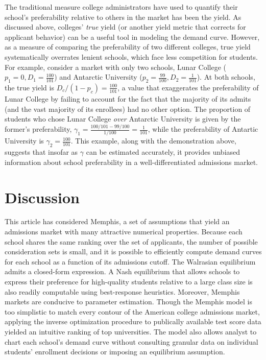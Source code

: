 \documentclass[12pt]{article}
\numberwithin{equation}{subsection}
\theoremstyle{definition}
\begin{document}
The traditional measure college administrators have used to quantify their school's preferability relative to others in the market has been the yield. As discussed above, colleges' \emph{true} yield (or another yield metric that corrects for applicant behavior) can be a useful tool in modeling the demand curve. However, as a measure of comparing the preferability of two different colleges, true yield systematically overrates lenient schools, which face less competition for students. For example, consider a market with only two schools, Lunar College ($p_1 = 0, D_1 =  \frac{100}{101}$) and Antarctic University ($p_2 = \frac{99}{100}, D_2 = \frac{1}{101}$). At both schools, the true yield is $D_c / (1 - p_c) = \frac{100}{101}$, a value that exaggerates the preferability of Lunar College by failing to account for the fact that the majority of its admits (and the vast majority of its enrollees) had no other option. The proportion of students who chose Lunar College \emph{over} Antarctic University is given by the former's preferability, $\gamma_1 = \frac{100/101 - 99/100}{1/100} = \frac{1}{101}$, while the preferability of Antartic University is $\gamma_2 = \frac{100}{101}$. This example, along with the demonstration above, suggests that insofar as $\gamma$ can be estimated accurately, it provides unbiased information about school preferability in a well-differentiated admissions market.

\section{Discussion}
This article has considered Memphis, a set of assumptions that yield an admissions market with many attractive numerical properties. Because each school shares the same ranking over the set of applicants, the number of possible consideration sets is small, and it is possible to efficiently compute demand curves for each school as a function of its admissions cutoff. The Walrasian equilibrium admits a closed-form expression. A Nash equilibrium that allows schools to express their preference for high-quality students relative to a large class size is also readily computable using best-response heuristics. Moreover, Memphis markets are conducive to parameter estimation. Though the Memphis model is too simplistic to match every contour of the American college admissions market, applying the inverse optimization procedure to publically available test score data yielded an intuitive ranking of top universities. The model also allows analyst to chart each school's demand curve without consulting granular data on individual students' enrollment decisions or imposing an equilibrium assumption.
\end{document}
